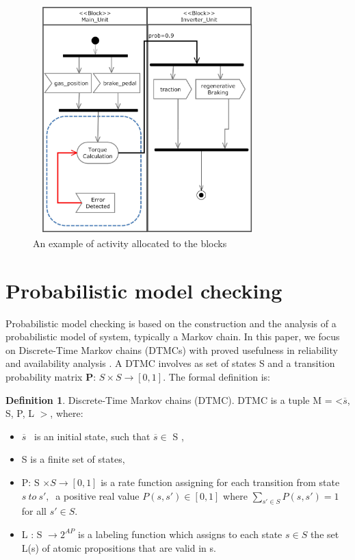 \documentclass[3p,times,procedia,authoryear,round]{elsarticle}
\begin{document}
\begin{figure}[!ht]
	\centering
	\includegraphics[width=250pt, height =250pt]{vmui.jpg}
	\caption{An example of activity allocated to the blocks}
	\label{mpeg}
\end{figure}






\section{Probabilistic model checking}
\label{section4}

Probabilistic model checking is based on the construction and the analysis of a probabilistic model of system, typically a Markov chain. In this paper, we focus on Discrete-Time Markov chains (DTMCs) with proved usefulness in reliability and availability analysis \citep{Franco2016} \citep{Kwiatkowska2009re}. A DTMC involves as set of states S and a transition probability matrix \textbf{P}: $ S \times S \rightarrow [0, 1] $. The formal definition is:
\theoremstyle{definition}
\newtheorem{mydef}{Definition}
\begin{mydef}Discrete-Time Markov chains (DTMC). DTMC is a tuple M = \textless $\overline{s} $, S, P, L $ >$, where:
\begin{itemize}
	\item $\overline{s} $ \ is an initial state, such that $ \overline{s} \in $ S ,
	\item S is a finite set of states,
	\item P: S $\times  S \rightarrow[0, 1] $ is a rate function assigning for each transition from state $s\ to\ s',\ $ a positive real value $P(s, s') \in [0, 1] $ where $\sum_{s'\in S} P(s, s')= 1$ for all $s' \in S$.
	\item L : S $\rightarrow 2^{AP}$ is a labeling function which assigns to each state $s  \in S$ the set L(s) of atomic propositions that are valid in s.
\end{itemize}

\end{mydef}
\end{document}
